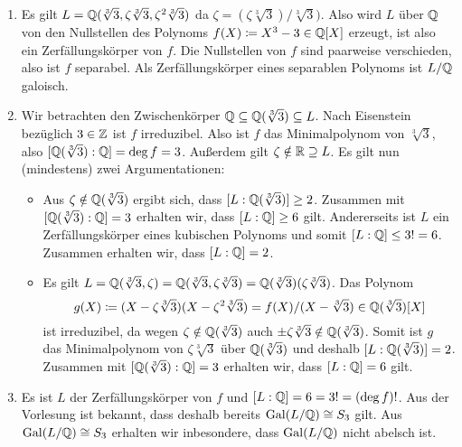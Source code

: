 \begin{solution}
  \begin{enumerate}
    \item
      Es gilt $L = \mathbb{Q}(\sqrt[3]{3}, \zeta \sqrt[3]{3}, \zeta^2 \sqrt[3]{3})$ da $\zeta = (\zeta \sqrt[3]{3}) / \sqrt[3]{3})$.
      Also wird $L$ über $\mathbb{Q}$ von den Nullstellen des Polynoms $f(X) \coloneqq X^3 - 3 \in \mathbb{Q}[X]$ erzeugt, ist also ein Zerfällungskörper von $f$.
      Die Nullstellen von $f$ sind paarweise verschieden, also ist $f$ separabel.
      Als Zerfällungskörper eines separablen Polynoms ist $L/\mathbb{Q}$ galoisch.
      
    \item
      Wir betrachten den Zwischenkörper $\mathbb{Q} \subseteq \mathbb{Q}(\sqrt[3]{3}) \subseteq L$.
      Nach Eisenstein bezüglich $3 \in \mathbb{Z}$ ist $f$ irreduzibel.
      Also ist $f$ das Minimalpolynom von $\sqrt[3]{3}$, also $[\mathbb{Q}(\sqrt[3]{3}) : \mathbb{Q}] = \deg f = 3$.
      Außerdem gilt $\zeta \notin \mathbb{R} \supseteq L$.
      Es gilt nun (mindestens) zwei Argumentationen:
      \begin{itemize}
        \item
          Aus $\zeta \notin \mathbb{Q}(\sqrt[3]{3})$ ergibt sich, dass $[L : \mathbb{Q}(\sqrt[3]{3})] \geq 2$.
          Zusammen mit $[\mathbb{Q}(\sqrt[3]{3}) : \mathbb{Q}] = 3$ erhalten wir, dass $[L : \mathbb{Q}] \geq 6$ gilt.
          Andererseits ist $L$ ein Zerfällungskörper eines kubischen Polynoms und somit $[L : \mathbb{Q}] \leq 3! = 6$.
          Zusammen erhalten wir, dass $[L : \mathbb{Q}] = 2$.
        \item
          Es gilt $L = \mathbb{Q}(\sqrt[3]{3}, \zeta) = \mathbb{Q}(\sqrt[3]{3}, \zeta \sqrt[3]{3}) = \mathbb{Q}(\sqrt[3]{3})(\zeta \sqrt[3]{3})$.
          Das Polynom
          \[
                      g(X)
            \coloneqq (X - \zeta \sqrt[3]{3})(X - \zeta^2 \sqrt[3]{3})
            =         f(X)/(X-\sqrt[3]{3})
            \in       \mathbb{Q}(\sqrt[3]{3})[X]
          \]
          ist irreduzibel, da wegen $\zeta \notin \mathbb{Q}(\sqrt[3]{3})$ auch $\pm \zeta \sqrt[3]{3} \notin \mathbb{Q}(\sqrt[3]{3})$.
          Somit ist $g$ das Minimalpolynom von $\zeta \sqrt[3]{3}$ über $\mathbb{Q}(\sqrt[3]{3})$ und deshalb $[L : \mathbb{Q}(\sqrt[3]{3})] = 2$.
          Zusammen mit $[\mathbb{Q}(\sqrt[3]{3}) : \mathbb{Q}] = 3$ erhalten wir, dass $[L : \mathbb{Q}] = 6$ gilt.
      \end{itemize}
          
    \item
      Es ist $L$ der Zerfällungskörper von $f$ und $[L : \mathbb{Q}] = 6 = 3! = (\deg f)!$.
      Aus der Vorlesung ist bekannt, dass deshalb bereits $\operatorname{Gal}(L/\mathbb{Q}) \cong S_3$ gilt.
      Aus $\operatorname{Gal}(L/\mathbb{Q}) \cong S_3$ erhalten wir inbesondere, dass $\operatorname{Gal}(L/\mathbb{Q})$ nicht abelsch ist.
      

\end{enumerate}
\end{solution}

